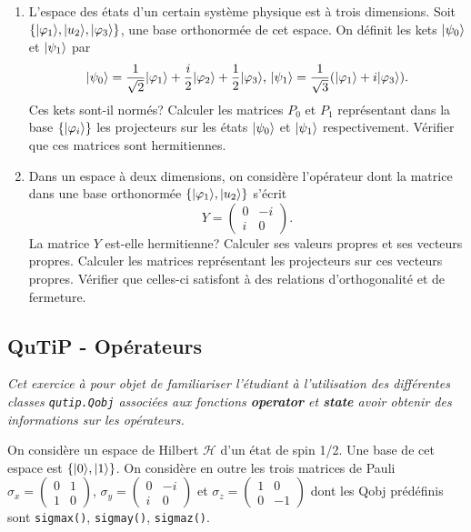 \begin{enumerate}
\item L'espace des états d'un certain système physique est à trois dimensions.
Soit $\{\vert\varphi_1\rangle, \vert u_{2}\rangle, \vert\varphi_3\rangle\}$, une base
orthonormée de cet espace. On définit les kets $\vert\psi_{0}\rangle$ et
$\vert\psi_1\rangle$ par
\begin{equation}
\vert\psi_{0}\rangle=\frac{1}{\sqrt{2}}\vert\varphi_1\rangle+\frac{i}{2}\vert\varphi_{2}\rangle
+\frac{1}{2}\vert\varphi_3\rangle \text{, }\vert\psi_1\rangle=\frac{1}{\sqrt{3}}(
\vert\varphi_1\rangle+i\vert\varphi_3\rangle).
\end{equation}
Ces kets sont-il normés? Calculer les matrices $P_{0}$ et $P_1$ représentant
dans la base $\{\vert\varphi_{i}\rangle\}$ les projecteurs sur les états
$\vert\psi_{0}\rangle$ et $\vert\psi_1\rangle$ respectivement. Vérifier que ces matrices
sont hermitiennes.

\item Dans un espace à deux dimensions, on considère l'opérateur dont la
matrice dans une base orthonormée $\{\vert\varphi_1\rangle,\vert u_{2}\rangle\}$ s'écrit
\begin{equation}
Y=\begin{pmatrix}
0 & -i\\
i & 0
\end{pmatrix}.
\end{equation}
La matrice $Y$ est-elle hermitienne? Calculer ses valeurs propres et ses
vecteurs propres. Calculer les matrices représentant les projecteurs sur ces
vecteurs propres. Vérifier que celles-ci satisfont à des relations
d'orthogonalité et de fermeture.

\end{enumerate}

\subsection{QuTiP - Opérateurs}

\emph{Cet exercice à pour objet de familiariser l'étudiant à l'utilisation des
différentes classes \texttt{qutip.Qobj} associées aux fonctions
\textbf{operator} et \textbf{state} avoir obtenir des informations sur les
opérateurs.}

On considère un espace de Hilbert $\mathcal{H}$ d'un état de spin 1/2. Une base
de cet espace est $\{\vert0\rangle,\vert1\rangle\}$. On considère en outre les trois matrices
de Pauli $\sigma_x = \begin{pmatrix}0 & 1 \\ 1 & 0 \end{pmatrix}$, $\sigma_y =
\begin{pmatrix}0 & -i \\ i & 0 \end{pmatrix}$ et
$\sigma_z = \begin{pmatrix}1 & 0 \\ 0 & -1 \end{pmatrix}$ dont les Qobj
prédéfinis sont \texttt{sigmax()}, \texttt{sigmay()}, \texttt{sigmaz()}.

